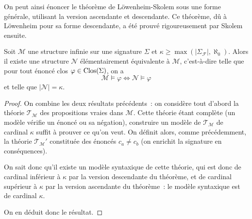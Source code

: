 On peut ainsi énoncer le théorème de Löwenheim-Skolem sous une forme générale,
utilisant la version ascendante et descendante. Ce théorème, dû à Löwenheim
pour sa forme descendante, a été prouvé rigoureusement par Skolem ensuite.

\begin{theorem}
  Soit $\mathcal M$ une structure infinie sur une signature $\Sigma$ et
  $\kappa \geq \max(|\Sigma_{\mathcal F}|,\aleph_0)$. Alors il existe une
  structure $\mathcal N$ élémentairement équivalente à $\mathcal M$,
  c'est-à-dire telle que pour tout énoncé clos $\varphi\in\operatorname{Clos}(\Sigma)$, on a
  \[\mathcal M \models \varphi \iff \mathcal N \models \varphi\]
  et telle que $|\mathcal N| = \kappa$.
\end{theorem}

\begin{proof}
  On combine les deux résultats précédents~: on considère tout d'abord la
  théorie $\mathcal T_{\mathcal M}$ des propositions vraies dans $\mathcal M$.
  Cette théorie étant complète (un modèle vérifie un énoncé ou sa négation),
  construire un modèle de $\mathcal T_{\mathcal M}$ de cardinal $\kappa$
  suffit à prouver ce qu'on veut. On définit alors, comme précédemment, la
  théorie $\mathcal T_\mathcal M'$ constituée des énoncés $c_a \neq c_b$
  (on enrichit la signature en conséquences).

  On sait donc qu'il existe un modèle syntaxique de cette théorie, qui est
  donc de cardinal inférieur à $\kappa$ par la version descendante du
  théorème, et de cardinal supérieur à $\kappa$ par la version ascendante
  du théorème~: le modèle syntaxique est de cardinal $\kappa$.

  On en déduit donc le résultat.
\end{proof}
